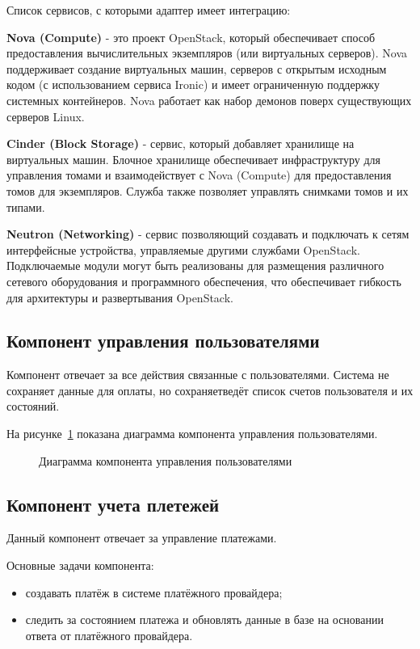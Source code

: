 Список сервисов, с которыми адаптер имеет интеграцию:

\textbf{Nova (Compute)} - это проект OpenStack, который обеспечивает способ предоставления вычислительных экземпляров (или виртуальных серверов). Nova поддерживает создание виртуальных машин, серверов с открытым исходным кодом (с использованием сервиса Ironic) и имеет ограниченную поддержку системных контейнеров. Nova работает как набор демонов поверх существующих серверов Linux.

\textbf{Cinder (Block Storage)} - сервис, который добавляет хранилище на виртуальных машин. Блочное хранилище обеспечивает инфраструктуру для управления томами и взаимодействует с Nova (Compute) для предоставления томов для экземпляров. Служба также позволяет управлять снимками томов и их типами.

\textbf{Neutron (Networking)} - сервис позволяющий создавать и подключать к сетям интерфейсные устройства, управляемые другими службами OpenStack. Подключаемые модули могут быть реализованы для размещения различного сетевого оборудования и программного обеспечения, что обеспечивает гибкость для архитектуры и развертывания OpenStack.

\subsection{Компонент управления пользователями}\label{sec:subs4}
Компонент отвечает за все действия связанные с пользователями. Система не сохраняет данные для оплаты, но сохраняетведёт список счетов пользователя и их состояний.

На рисунке~\ref{fig:users_control_scheme} показана диаграмма компонента управления пользователями.
\begin{figure}[ht]
  \caption{Диаграмма компонента управления пользователями}\label{fig:users_control_scheme}
\end{figure}

\subsection{Компонент учета плетежей}\label{sec:subs5}
Данный компонент отвечает за управление платежами.

Основные задачи компонента:
\begin{itemize}
  \item создавать платёж в системе платёжного провайдера;
  \item следить за состоянием платежа и обновлять данные в базе на основании ответа от платёжного провайдера. 
\end{itemize}

